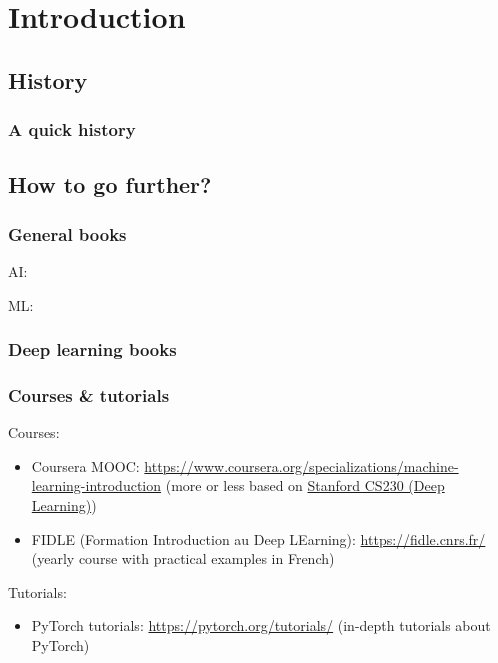 \section{Introduction}

\subsection{History}

\begin{frame}
  \frametitle{A quick history}

\end{frame}

\subsection{How to go further?}

\begin{frame}
  \frametitle{General books}

  \nocite{*}

  AI:
  \printbibliography[heading=none,category=AI]

  \ac{ML}:
  \printbibliography[heading=none,category=ML]
\end{frame}

\begin{frame}
  \frametitle{Deep learning books}

  \nocite{*}

  \printbibliography[heading=none,category=deep_learning]
\end{frame}

\begin{frame}
  \frametitle{Courses \& tutorials}

  Courses:
  \begin{itemize}
  \item Coursera MOOC:
    \url{https://www.coursera.org/specializations/machine-learning-introduction} (more or less based on \href{https://cs230.stanford.edu/}{Stanford CS230 (Deep Learning)})
  \item FIDLE (Formation Introduction au Deep LEarning): \url{https://fidle.cnrs.fr/}
    (yearly course with practical examples in French)
  \end{itemize}

  Tutorials:
  \begin{itemize}
  \item PyTorch tutorials: \url{https://pytorch.org/tutorials/} (in-depth
    tutorials about PyTorch)
  \end{itemize}
\end{frame}
